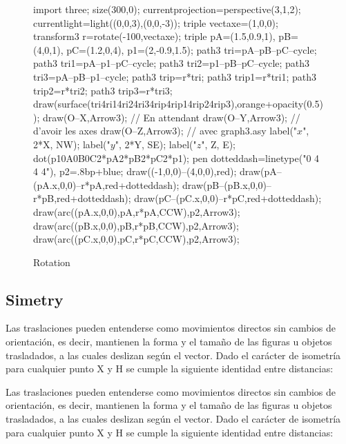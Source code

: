 \begin{figure}[!ht]
	\centering
	\begin{asy}
	import three;
	size(300,0);
	currentprojection=perspective(3,1,2);
	currentlight=light((0,0,3),(0,0,-3));
	triple vectaxe=(1,0,0);
	transform3 r=rotate(-100,vectaxe);
	triple pA=(1.5,0.9,1), pB=(4,0,1), pC=(1.2,0,4), p1=(2,-0.9,1.5);
	path3 tri=pA--pB--pC--cycle;
	path3 tri1=pA--p1--pC--cycle;
	path3 tri2=p1--pB--pC--cycle;
	path3 tri3=pA--pB--p1--cycle;
	path3 trip=r*tri;
	path3 trip1=r*tri1;
	path3 trip2=r*tri2;
	path3 trip3=r*tri3;
	draw(surface(tri^^tri1^^tri2^^tri3^^trip^^trip1^^trip2^^trip3),orange+opacity(0.5));
	draw(O--X,Arrow3); // En attendant
	draw(O--Y,Arrow3); // d’avoir les axes
	draw(O--Z,Arrow3); // avec graph3.asy
	label("$x$", 2*X, NW);
	label("$y$", 2*Y, SE);
	label("$z$", Z, E);
	dot(p1^^pA^^pB^^pC^^r*pA^^r*pB^^r*pC^^r*p1);
	pen dotteddash=linetype("0 4 4 4"),
	p2=.8bp+blue;
	draw((-1,0,0)--(4,0,0),red);
	draw(pA--(pA.x,0,0)--r*pA,red+dotteddash);
	draw(pB--(pB.x,0,0)--r*pB,red+dotteddash);
	draw(pC--(pC.x,0,0)--r*pC,red+dotteddash);
	draw(arc((pA.x,0,0),pA,r*pA,CCW),p2,Arrow3);
	draw(arc((pB.x,0,0),pB,r*pB,CCW),p2,Arrow3);
	draw(arc((pC.x,0,0),pC,r*pC,CCW),p2,Arrow3);
	\end{asy}
	\caption{Rotation}
\end{figure}

\subsection{Simetry}

Las traslaciones pueden entenderse como movimientos directos sin cambios de orientación, es decir, mantienen la forma y el tamaño de las figuras u objetos trasladados, a las cuales deslizan según el vector. Dado el carácter de isometría para cualquier punto X y H se cumple la siguiente identidad entre distancias:

Las traslaciones pueden entenderse como movimientos directos sin cambios de orientación, es decir, mantienen la forma y el tamaño de las figuras u objetos trasladados, a las cuales deslizan según el vector. Dado el carácter de isometría para cualquier punto X y H se cumple la siguiente identidad entre distancias:

